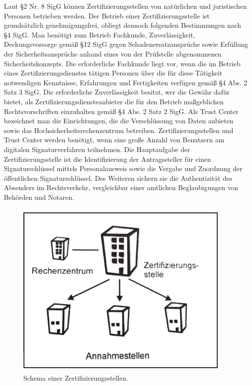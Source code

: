 Laut \S 2 Nr. 8 SigG können Zertifizierungsstellen von natürlichen und juristischen Personen betrieben werden. Der Betrieb einer Zertifizierungsstelle ist grundsätzlich genehmigungsfrei, obliegt dennoch folgenden Bestimmungen nach \S 4 SigG. Man benötigt zum Betrieb Fachkunde, Zuverlässigkeit, Deckungsvorsorge gemäß \S 12 SigG gegen Schadenersatzansprüche sowie Erfüllung der Sicherheitsansprüche anhand eines von der Prüfstelle abgenommenen Sicherheitskonzepts. Die erforderliche Fachkunde liegt vor, wenn die im Betrieb eines Zertifizierungsdienstes tätigen Personen über die für diese Tätigkeit notwendigen Kenntnisse, Erfahrungen und Fertigkeiten verfügen gemäß \S 4 Abs. 2 Satz 3 SigG. Die erforderliche Zuverlässigkeit besitzt, wer die Gewähr dafür bietet, als Zertifizierungsdiensteanbieter die für den Betrieb maßgeblichen Rechtsvorschriften einzuhalten gemäß \S 4 Abs. 2 Satz 2 SigG. Als Trust Center bezeichnet man die Einrichtungen, die die Verschlüssung von Daten anbieten sowie das Hochsicherheitsrechenzentrum betreiben. Zertifizierungsstellen und Trust Center werden benötigt, wenn eine große Anzahl von Benutzern am digitalen Signaturverfahren teilnehmen. Die Hauptaufgabe der Zertifizierungsstelle ist die Identifizierung der Antragssteller für einen Signaturschlüssel mittels Personalausweis sowie die Vergabe und Zuordnung der öffentlichen Signaturschlüssel. Des Weiteren sichern sie die Authentizität des Absenders im Rechtsverkehr, vergleichbar einer amtlichen Beglaubigungen von Behörden und Notaren. \cite{standdeswissens3}\cite{zertstelle1} 
\begin{figure}[!ht]
    \centering
    \includegraphics[height=250pt, width=300pt]{trustcenterNeu3.jpg}
    \caption[Schema einer Zertifizierungsstellen]{\small{Schema einer Zertifizierungsstellen. \cite{trust1}}}
    \label{fig:1}
\end{figure}\\
